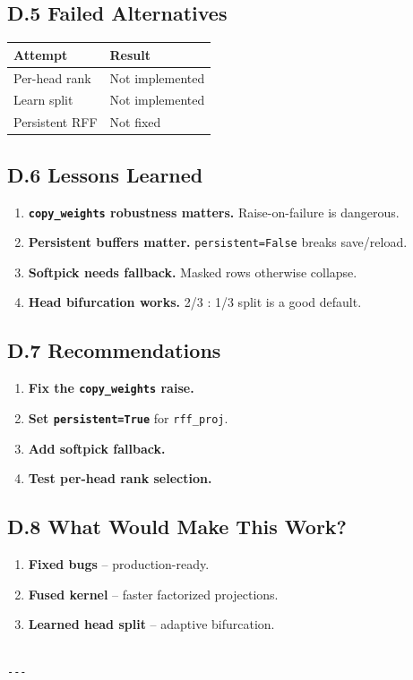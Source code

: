 \subsection{D.5 Failed Alternatives}

\begin{table}[H]
\centering
\small
\begin{tabular}{ll}
\toprule
\textbf{Attempt} & \textbf{Result} \\
\midrule
Per-head rank & Not implemented \\
Learn split & Not implemented \\
Persistent RFF & Not fixed \\
\bottomrule
\end{tabular}
\end{table}

\subsection{D.6 Lessons Learned}

\begin{enumerate}
\item \textbf{\texttt{copy\_weights} robustness matters.} Raise-on-failure is dangerous.
\item \textbf{Persistent buffers matter.} \texttt{persistent=False} breaks save/reload.
\item \textbf{Softpick needs fallback.} Masked rows otherwise collapse.
\item \textbf{Head bifurcation works.} 2/3 : 1/3 split is a good default.

\end{enumerate}
\subsection{D.7 Recommendations}

\begin{enumerate}
\item \textbf{Fix the \texttt{copy\_weights} raise.}
\item \textbf{Set \texttt{persistent=True}} for \texttt{rff\_proj}.
\item \textbf{Add softpick fallback.}
\item \textbf{Test per-head rank selection.}

\end{enumerate}
\subsection{D.8 What Would Make This Work?}

\begin{enumerate}
\item \textbf{Fixed bugs} -- production-ready.
\item \textbf{Fused kernel} -- faster factorized projections.
\item \textbf{Learned head split} -- adaptive bifurcation.
\end{enumerate}
\begin{lstlisting}

---
\end{lstlisting}